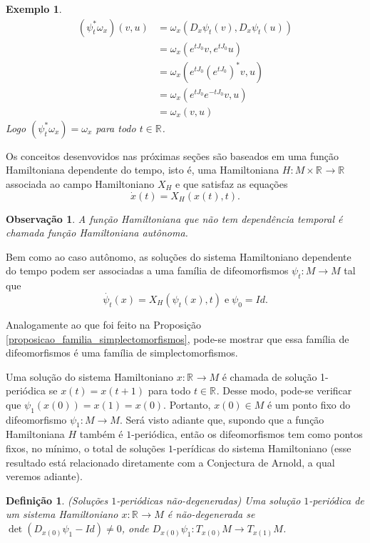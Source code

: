 \documentclass[12pt]{book}
\newtheorem{definicao}[teorema]{Definição}
\newtheorem{exemplo}[teorema]{Exemplo}
\newtheorem{observacao}[teorema]{Observação}
\newcommand{\campohamiltoniano}[1]{X_{H}(#1)}
\newcommand{\campohamiltonianoabrev}{X_{H}}
\newcommand{\estruturacomplexa}{J_{0}}
\newcommand{\real}[1]{\mathbb{R}^{#1}}
\newcommand{\reta}{\real{}}
\begin{document}
\begin{exemplo}
		$$
		\begin{aligned}
		(\psi^{*}_{t}\omega_{x})(v,u)
		&=\omega_{x}(D_{x}\psi_{t}(v), D_{x}\psi_{t}(u))
		\\
		&=\omega_{x}(e^{t\estruturacomplexa}v,e^{t\estruturacomplexa}u)
		\\
		&=\omega_{x}(e^{t\estruturacomplexa}(e^{t\estruturacomplexa})^{*}v,u)
		\\
		&=\omega_{x}(e^{t\estruturacomplexa}e^{-t\estruturacomplexa}v,u)
		\\
		&=\omega_{x}(v,u)
		\end{aligned}
		$$
		Logo $	(\psi^{*}_{t}\omega_{x}) = \omega_{x}$ para todo $t\in \reta$.
	\end{exemplo}
	
	Os conceitos desenvovidos nas próximas seções são baseados em uma função Hamiltoniana dependente do tempo, isto é, uma Hamiltoniana $H:M\times \reta\to \reta$ associada ao campo Hamiltoniano $\campohamiltonianoabrev$ e que satisfaz as equações
	$$
	\dot{x}(t) = \campohamiltoniano{x(t),t}.
	$$
	
	\begin{observacao}
		A função Hamiltoniana que não tem dependência temporal 	é chamada função Hamiltoniana autônoma.
	\end{observacao}
	
	Bem como ao caso autônomo, as soluções do sistema Hamiltoniano dependente do tempo podem ser associadas a uma família de difeomorfismos $\psi_{t}:M \to M$ tal que
	$$
	\dot{\psi_{t}}(x) = \campohamiltoniano{\psi_{t}(x), t}\; \text{e} \; \psi_{0}=Id. 
	$$ 
	
	Analogamente ao que foi feito na Proposição \ref{proposicao_familia_simplectomorfismos}, pode-se mostrar que essa família de difeomorfismos é uma família de simplectomorfismos.
	
	Uma solução do sistema Hamiltoniano $x:\reta\to M$ é chamada de solução 1-periódica se $x(t) = x(t+1)$ para todo $t\in \reta$. Desse modo, pode-se verificar que $\psi_{1}(x(0)) = x(1) = x(0)$. Portanto, $x(0)\in M$ é um ponto fixo do difeomorfismo $\psi_{1}:M\to M$. Será visto adiante que, supondo que a função Hamiltoniana $H$ também é $1$-periódica, então os difeomorfismos tem como pontos fixos, no mínimo, o total de soluções $1$-perídicas do sistema Hamiltoniano (esse resultado está relacionado diretamente com a Conjectura de Arnold, a qual veremos adiante).
	
	\begin{definicao}(Soluções $1$-periódicas não-degeneradas)
		Uma solução $1$-periódica de um sistema Hamiltoniano $x: \reta\to M$ é não-degenerada se $\det(D_{x(0)}\psi_{1} - Id)\neq 0$, onde $D_{x(0)}\psi_{1}:T_{x(0)}M \to T_{x(1)}M$.
	\end{definicao}
	
\end{document}
